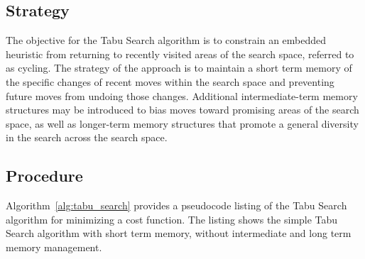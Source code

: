 \subsection{Strategy}
The objective for the Tabu Search algorithm is to constrain an embedded heuristic from returning to recently visited areas of the search space, referred to as cycling. 
The strategy of the approach is to maintain a short term memory of the specific changes of recent moves within the search space and preventing future moves from undoing those changes. Additional intermediate-term memory structures may be introduced to bias moves toward promising areas of the search space, as well as longer-term memory structures that promote a general diversity in the search across the search space.

\subsection{Procedure}
Algorithm~\ref{alg:tabu_search} provides a pseudocode listing of the Tabu Search algorithm for minimizing a cost function. The listing shows the simple Tabu Search algorithm with short term memory, without intermediate and long term memory management. 

